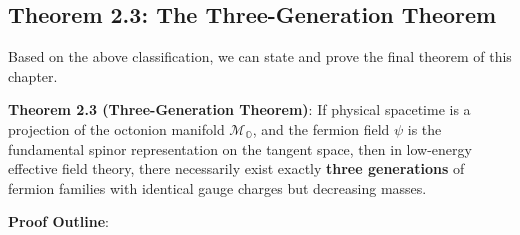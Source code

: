 \subsection{Theorem 2.3: The Three-Generation Theorem}

Based on the above classification, we can state and prove the final theorem of this chapter.

\textbf{Theorem 2.3 (Three-Generation Theorem)}:
If physical spacetime is a projection of the octonion manifold $\mathcal{M}_\mathbb{O}$, and the fermion field $\psi$ is the fundamental spinor representation on the tangent space, then in low-energy effective field theory, there necessarily exist exactly \textbf{three generations} of fermion families with identical gauge charges but decreasing masses.

\textbf{Proof Outline}:

